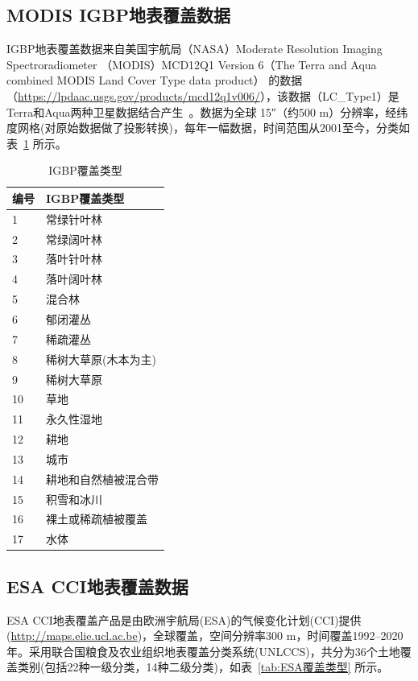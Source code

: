 \subsection{MODIS IGBP地表覆盖数据}\label{IGBP地表覆盖数据}
IGBP地表覆盖数据来自美国宇航局（NASA）Moderate Resolution Imaging Spectroradiometer 
（MODIS）MCD12Q1 Version 6（The Terra and Aqua combined MODIS Land Cover Type data product）
的数据（\url{https://lpdaac.usgs.gov/products/mcd12q1v006/}），该数据（LC\_Type1）是Terra和Aqua两种卫星数据结合产生~\citep{Friedl2019}。数据为全球 \ang{;;15}（约500 m）分辨率，经纬度网格(对原始数据做了投影转换)，每年一幅数据，时间范围从2001至今，分类如表~\ref{tab:IGBP覆盖类型} 所示。

\begin{table}[htbp]
  \centering
  \caption{IGBP覆盖类型}
  \label{tab:IGBP覆盖类型}
  \begin{tabular}{@{}ll@{}}
    \toprule
    编号 & IGBP覆盖类型         \\ \midrule
    1    & 常绿针叶林           \\
    2    & 常绿阔叶林           \\
    3    & 落叶针叶林           \\
    4    & 落叶阔叶林           \\
    5    & 混合林               \\
    6    & 郁闭灌丛             \\
    7    & 稀疏灌丛             \\
    8    & 稀树大草原(木本为主) \\
    9    & 稀树大草原           \\
    10   & 草地                 \\
    11   & 永久性湿地           \\
    12   & 耕地                 \\
    13   & 城市                 \\
    14   & 耕地和自然植被混合带 \\
    15   & 积雪和冰川           \\
    16   & 裸土或稀疏植被覆盖   \\
    17   & 水体                 \\ \bottomrule
  \end{tabular}
\end{table}

\subsection{ESA CCI地表覆盖数据}\label{ESA地表覆盖数据}
ESA CCI地表覆盖产品是由欧洲宇航局(ESA)的气候变化计划(CCI)提供(\url{http://maps.elie.ucl.ac.be})，全球覆盖，空间分辨率300 m，时间覆盖1992--2020年。采用联合国粮食及农业组织地表覆盖分类系统(UNLCCS)，共分为36个土地覆盖类别(包括22种一级分类，14种二级分类)，如表~\ref{tab:ESA覆盖类型} 所示。

